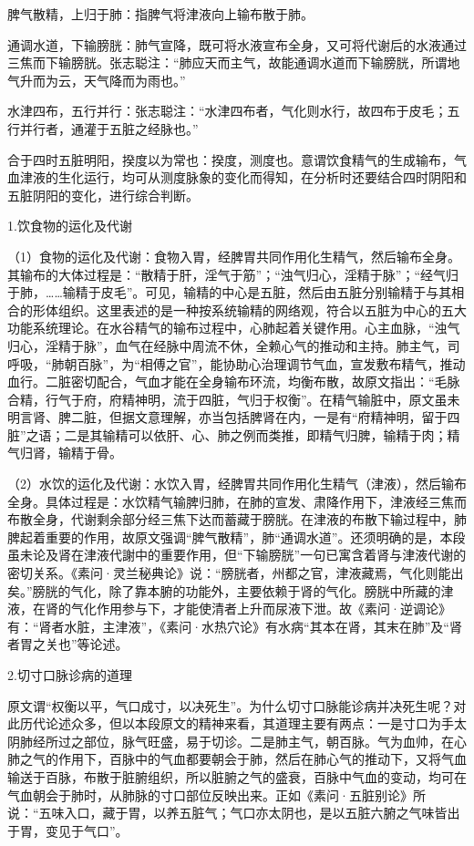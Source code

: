 \documentclass[12pt]{ctexbook}
\begin{document}
\begin{jiaozhu}
  \item 脾气散精，上归于肺：指脾气将津液向上输布散于肺。
  \item 通调水道，下输膀胱：肺气宣降，既可将水液宣布全身，又可将代谢后的水液通过三焦而下输膀胱。张志聪注：“肺应天而主气，故能通调水道而下输膀胱，所谓地气升而为云，天气降而为雨也。”
  \item 水津四布，五行并行：张志聪注：“水津四布者，气化则水行，故四布于皮毛；五行并行者，通灌于五脏之经脉也。”
  \item 合于四时五脏明阳，揆度以为常也：揆度，测度也。意谓饮食精气的生成输布，气血津液的生化运行，均可从测度脉象的变化而得知，在分析时还要结合四时阴阳和五脏阴阳的变化，进行综合判断。
\end{jiaozhu}


1.饮食物的运化及代谢

（1）食物的运化及代谢：食物入胃，经脾胃共同作用化生精气，然后输布全身。其输布的大体过程是：“散精于肝，淫气于筋”；“浊气归心，淫精于脉”；“经气归于肺，……输精于皮毛”。可见，输精的中心是五脏，然后由五脏分别输精于与其相合的形体组织。这里表述的是一种按系统输精的网络观，符合以五脏为中心的五大功能系统理论。在水谷精气的输布过程中，心肺起着关键作用。心主血脉，“浊气归心，淫精于脉”，血气在经脉中周流不休，全赖心气的推动和主持。肺主气，司呼吸，“肺朝百脉”，为“相傅之官”，能协助心治理调节气血，宣发敷布精气，推动血行。二脏密切配合，气血才能在全身输布环流，均衡布散，故原文指出：“毛脉合精，行气于府，府精神明，流于四脏，气归于权衡”。在精气输脏中，原文虽未明言肾、脾二脏，但据文意理解，亦当包括脾肾在内，一是有“府精神明，留于四脏”之语；二是其输精可以依肝、心、肺之例而类推，即精气归脾，输精于肉；精气归肾，输精于骨。

（2）水饮的运化及代谢：水饮入胃，经脾胃共同作用化生精气（津液），然后输布全身。具体过程是：水饮精气输脾归肺，在肺的宣发、肃降作用下，津液经三焦而布散全身，代谢剩余部分经三焦下达而蓄藏于膀胱。在津液的布散下输过程中，肺脾起着重要的作用，故原文强调“脾气散精”，肺“通调水道”。还须明确的是，本段虽未论及肾在津液代謝中的重要作用，但“下输膀胱”一句已寓含着肾与津液代谢的密切关系。《素问·灵兰秘典论》说：“膀胱者，州都之官，津液藏焉，气化则能出矣。”膀胱的气化，除了靠本腑的功能外，主要依赖于肾的气化。膀胱中所藏的津液，在肾的气化作用参与下，才能使清者上升而尿液下泄。故《素问·逆调论》有：“肾者水脏，主津液”，《素问·水热穴论》有水病“其本在肾，其末在肺”及“肾者胃之关也”等论述。

2.切寸口脉诊病的道理

原文谓“权衡以平，气口成寸，以决死生”。为什么切寸口脉能诊病并决死生呢？对此历代论述众多，但以本段原文的精神来看，其道理主要有两点：一是寸口为手太阴肺经所过之部位，脉气旺盛，易于切诊。二是肺主气，朝百脉。气为血帅，在心肺之气的作用下，百脉中的气血都要朝会于肺，然后在肺心气的推动下，又将气血输送于百脉，布散于脏腑组织，所以脏腑之气的盛衰，百脉中气血的变动，均可在气血朝会于肺时，从肺脉的寸口部位反映出来。正如《素问·五脏别论》所说：“五味入口，藏于胃，以养五脏气；气口亦太阴也，是以五脏六腑之气味皆出于胃，变见于气口”。
\end{document}
